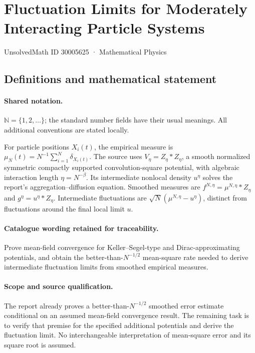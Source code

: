 \documentclass[11pt]{article}
\begin{document}
\setcounter{section}{30005624}
\section{Fluctuation Limits for Moderately Interacting Particle Systems}\label{30005625}
{\small UnsolvedMath ID 30005625 · Mathematical Physics}
\subsection{Definitions and mathematical statement}

\paragraph{Shared notation.}$\mathbb N=\{1,2,\ldots\}$; the standard number fields have their usual meanings. All additional conventions are stated locally.


For particle positions $X_i(t)$, the empirical measure is $\mu_N(t)=N^{-1}\sum_{i=1}^N\delta_{X_i(t)}$. The source uses $V_\eta=Z_\eta*Z_\eta$, a smooth normalized symmetric compactly supported convolution-square potential, with algebraic interaction length $\eta=N^{-\beta}$. Its intermediate nonlocal density $u^\eta$ solves the report's aggregation--diffusion equation. Smoothed measures are $f^{N,\eta}=\mu^{N,\eta}*Z_\eta$ and $g^\eta=u^\eta*Z_\eta$. Intermediate fluctuations are $\sqrt N(\mu^{N,\eta}-u^\eta)$, distinct from fluctuations around the final local limit $u$.

\paragraph{Catalogue wording retained for traceability.}
Prove mean-field convergence for Keller–Segel-type and Dirac-approximating potentials, and obtain the better-than-$N^{-1/2}$ mean-square rate needed to derive intermediate fluctuation limits from smoothed empirical measures.

\paragraph{Scope and source qualification.}The report already proves a better-than-$N^{-1/2}$ smoothed error estimate conditional on an assumed mean-field convergence result. The remaining task is to verify that premise for the specified additional potentials and derive the fluctuation limit. No interchangeable interpretation of mean-square error and its square root is assumed.
\end{document}

